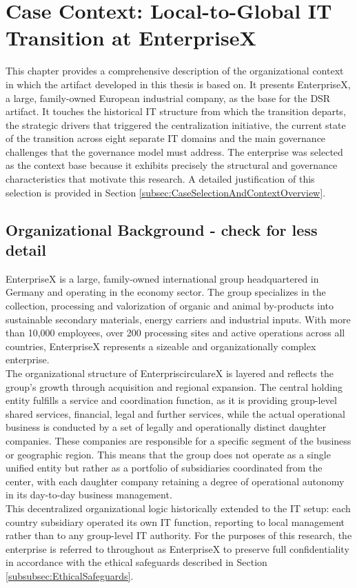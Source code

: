 \newpage
\section{Case Context: Local-to-Global IT Transition at EnterpriseX}
\label{sec:CaseContextLocalToGlobalITTransition}
This chapter provides a comprehensive description of the organizational context in which the artifact developed in this thesis is based on.
It presents EnterpriseX, a large, family-owned European industrial company, as the base for the \ac{DSR} artifact.
It touches the historical IT structure from which the transition departs, the strategic drivers that triggered the centralization initiative, the current state of the transition across eight separate IT domains and the main governance challenges that the governance model must address.
The enterprise was selected as the context base because it exhibits precisely the structural and governance characteristics that motivate this research.
A detailed justification of this selection is provided in Section \ref{subsec:CaseSelectionAndContextOverview}.


\subsection{Organizational Background - check for less detail}
\label{subsec:OrganizationalBackground}
EnterpriseX is a large, family-owned international group headquartered in Germany and operating in the  economy sector.
The group specializes in the collection, processing and valorization of organic and animal by-products into sustainable secondary materials, energy carriers and industrial inputs.
With more than 10,000 employees, over 200 processing sites and active operations across all countries, EnterpriseX represents a sizeable and organizationally complex enterprise.
\\
The organizational structure of EnterpriscirculareX is layered and reflects the group's growth through acquisition and regional expansion.
The central holding entity fulfills a service and coordination function, as it is providing group-level shared services, financial, legal and further services, while the actual operational business is conducted by a set of legally and operationally distinct daughter companies.
These companies are responsible for a specific segment of the business or geographic region.
This means that the group does not operate as a single unified entity but rather as a portfolio of subsidiaries coordinated from the center, with each daughter company retaining a degree of operational autonomy in its day-to-day business management.
\\
This decentralized organizational logic historically extended to the IT setup: each country subsidiary operated its own IT function, reporting to local management rather than to any group-level IT authority.
For the purposes of this research, the enterprise is referred to throughout as EnterpriseX to preserve full confidentiality in accordance with the ethical safeguards described in Section \ref{subsubsec:EthicalSafeguards}.


